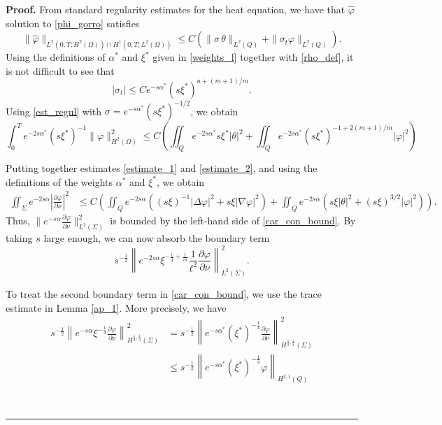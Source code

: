 \documentclass[preprint,10pt]{article}
\newenvironment{proof}[1][Proof]{\noindent\textbf{#1.} }{\ \rule{0.5em}{0.5em}}
\numberwithin{equation}{section}
\numberwithin{theorem}{section}
\begin{document}
{\begin{proof}
From standard regularity estimates for the heat equation, we have that $\widehat{\varphi}$ solution to \eqref{phi_gorro} satisfies
%
\begin{equation}\label{est_regul}
\|\widehat{\varphi}\|_{L^2(0,T;H^2(\Omega))\cap H^1(0,T;L^2(\Omega))}\leq C\left(\|\sigma\,\theta\|_{L^2(Q)}+\|\sigma_t\varphi\|_{L^2(Q)}\right).
\end{equation}
%
Using the definitions of $\alpha^*$ and $\xi^*$ given in \eqref{weights_l} together with \eqref{rho_def}, it is not difficult to see that 
%
\begin{equation}
|\sigma_t|\leq Ce^{-s\alpha^*}(s\xi^*)^{a+{(m+1)}/{m}}.
\end{equation}
%
Using \eqref{est_regul} with $\sigma=e^{-s\alpha^*}(s\xi^*)^{-1/2}$, we obtain
%
\begin{equation}\label{estimate_2}
\int_{0}^T e^{-2s\alpha^*}(s\xi^{*})^{-1}\|\varphi\|_{H^2(\Omega)}^2\leq C\left(\iint_Qe^{-2s\alpha^*}s\xi^*|\theta|^2+\iint_Qe^{-2s\alpha^*}(s\xi^*)^{-1+2(m+1)/m}|\varphi|^2\right)
\end{equation}

Putting together estimates \eqref{estimate_1} and \eqref{estimate_2}, and using the definitions of the weights $\alpha^*$ and $\xi^*$, we obtain
%
\begin{equation*}
\begin{split}
\iint_{\Sigma}e^{-2s\alpha}\left|\frac{\partial \varphi}{\partial \nu}\right|^2&\leq C\left(\iint_Q e^{-2s\alpha}\left((s\xi)^{-1}|\Delta \varphi|^2 + s\xi|\nabla \varphi|^2\right)+\iint_Qe^{-2s\alpha}\left(s\xi|\theta|^2+(s\xi)^{3/2}|\varphi|^2\right)\right).
\end{split}
\end{equation*}
%
Thus, $\|e^{-s\alpha}\frac{\partial \varphi}{\partial \nu}\|_{L^2(\Sigma)}^2$ is bounded by the left-hand side of \eqref{car_con_bound}. By taking $s$ large enough, we can now absorb the boundary term 
%
\[
s^{-\frac{1}{2}}\left\| e^{-2s\alpha}\xi^{-\frac{1}{4}+\frac{1}{m}} \frac{1}{\ell^2}\frac{\partial \varphi}{\partial \nu} \right\|^{2}_{L^2(\Sigma)}.
\]

To treat the second boundary term in \eqref{car_con_bound}, we use the trace estimate in Lemma \ref{ap_1}. More precisely, we have 
%
\begin{equation}\label{est_trace}
\begin{split}
s^{-\frac{1}{2}}\left\|e^{-s\alpha}\xi^{-\frac{1}{4}} \frac{\partial \varphi}{\partial \nu} \right\|^2_{H^{\frac{1}{2},\frac{1}{4}}(\Sigma)}&=s^{-\frac{1}{2}}\left\|e^{-s\alpha^*}(\xi^*)^{-\frac{1}{4}} \frac{\partial \varphi}{\partial \nu} \right\|^2_{H^{\frac{1}{2},\frac{1}{4}}(\Sigma)} \\
&\leq s^{-\frac{1}{2}}\left\| e^{-s\alpha^*}(\xi^*)^{-\frac{1}{4}} \varphi \right\|_{H^{2,1}(Q)}
\end{split}
\end{equation}


\end{proof}}
\end{document}
